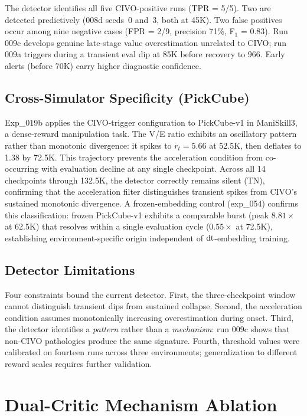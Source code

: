 The detector identifies all five CIVO-positive runs (TPR = 5/5). Two are detected predictively (008d seeds~0 and~3, both at 45K). Two false positives occur among nine negative cases (FPR = 2/9, precision 71\%, F$_1$ = 0.83). Run 009c develops genuine late-stage value overestimation unrelated to CIVO; run 009a triggers during a transient eval dip at 85K before recovery to 966. Early alerts (before 70K) carry higher diagnostic confidence.

\subsection{Cross-Simulator Specificity (PickCube)}

Exp\_019b applies the CIVO-trigger configuration to PickCube-v1 in ManiSkill3, a dense-reward manipulation task. The V/E ratio exhibits an oscillatory pattern rather than monotonic divergence: it spikes to $r_t = 5.66$ at 52.5K, then deflates to 1.38 by 72.5K. This trajectory prevents the acceleration condition from co-occurring with evaluation decline at any single checkpoint. Across all 14 checkpoints through 132.5K, the detector correctly remains silent (TN), confirming that the acceleration filter distinguishes transient spikes from CIVO's sustained monotonic divergence. A frozen-embedding control (exp\_054) confirms this classification: frozen PickCube-v1 exhibits a comparable burst (peak $8.81\times$ at 62.5K) that resolves within a single evaluation cycle ($0.55\times$ at 72.5K), establishing environment-specific origin independent of $\mathrm{dt}$-embedding training.

\subsection{Detector Limitations}

Four constraints bound the current detector. First, the three-checkpoint window cannot distinguish transient dips from sustained collapse. Second, the acceleration condition assumes monotonically increasing overestimation during onset. Third, the detector identifies a \emph{pattern} rather than a \emph{mechanism}: run 009c shows that non-CIVO pathologies produce the same signature. Fourth, threshold values were calibrated on fourteen runs across three environments; generalization to different reward scales requires further validation.

\section{Dual-Critic Mechanism Ablation}
\label{sec:dual_critic_appendix}

